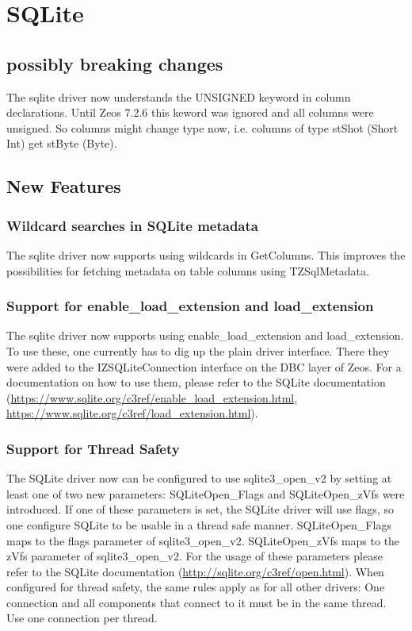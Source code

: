 \documentclass[a4paper,12pt,oneside]{book}
\begin{document}
\section{SQLite}

\subsection{possibly breaking changes}

The sqlite driver now understands the UNSIGNED keyword in column declarations.
Until Zeos 7.2.6 this keword was ignored and all columns were unsigned.
So columns might change type now, i.e. columns of type stShot (Short Int) get stByte (Byte).

\subsection{New Features}

\subsubsection{Wildcard searches in SQLite metadata}
The sqlite driver now supports using wildcards in GetColumns.
This improves the possibilities for fetching metadata on table columns using TZSqlMetadata.

\subsubsection{Support for enable\_load\_extension and load\_extension}
The sqlite driver now supports using enable\_load\_extension and load\_extension.
To use these, one currently has to dig up the plain driver interface.
There they were added to the IZSQLiteConnection interface on the DBC layer of Zeos.
For a documentation on how to use them, please refer to the SQLite documentation (\url{https://www.sqlite.org/c3ref/enable_load_extension.html}, \url{https://www.sqlite.org/c3ref/load_extension.html}).

\subsubsection{Support for Thread Safety}
The SQLite driver now can be configured to use sqlite3\_open\_v2 by setting at least one of two new parameters:
SQLiteOpen\_Flags and SQLiteOpen\_zVfs were introduced.
If one of these parameters is set, the SQLite driver will use flags, so one configure SQLite to be usable in a thread safe manner.
SQLiteOpen\_Flags maps to the flags parameter of sqlite3\_open\_v2.
SQLiteOpen\_zVfs maps to the zVfs parameter of sqlite3\_open\_v2.
For the usage of these parameters please refer to the SQLite documentation (\url{http://sqlite.org/c3ref/open.html}).
When configured for thread safety, the same rules apply as for all other drivers:
One connection and all components that connect to it must be in the same thread.
Use one connection per thread.
\end{document}
